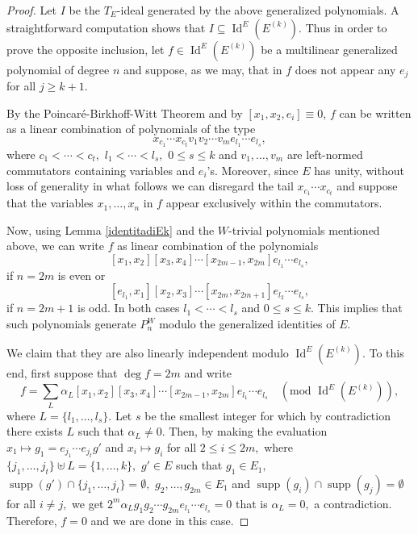 \documentclass[10pt,a4paper]{amsart}
\DeclareMathOperator{\I}{Id}
\DeclareMathOperator{\supp}{supp}
\begin{document}
\begin{proof}
    Let $I$ be the $T_E$-ideal generated by the above generalized polynomials. A straightforward computation shows that $I\subseteq \I^E(E^{(k)}).$ Thus in order to prove the opposite inclusion, let $f\in\I^E(E^{(k)})$ be a multilinear generalized polynomial of degree $n$ and suppose, as we may, that in $f$ does not appear any $e_j$ for all $j\geq k+1.$ 

    By the Poincaré-Birkhoff-Witt Theorem and by $[x_1,x_2,e_i]\equiv 0$, $f$ can be written as a linear combination of polynomials of the type
    $$
    x_{c_1}\cdots x_{c_t}v_1v_2\cdots v_me_{l_1}\cdots e_{l_s},
    $$
    where $c_1<\cdots < c_t,$ $l_1<\cdots <l_s,$ $0\leq s\leq k$ and $v_1,\ldots, v_m$ are left-normed commutators containing variables and $e_i$'s. Moreover, since $E$ has unity, without loss of generality in what follows we can disregard the tail $x_{c_1}\cdots x_{c_t}$ and suppose that the variables $x_1,\ldots,x_n$ in $f$ appear exclusively within the commutators.
    
    Now, using Lemma \ref{identitadiEk} and the $W$-trivial polynomials mentioned above, we can write $f$ as linear combination of the polynomials
    \begin{equation}\label{polinomigradopari}
    [x_{1},x_{2}][x_3,x_4]\cdots [x_{2m-1},x_{2m}]e_{l_1}\cdots e_{l_s},
    \end{equation}
    if $n=2m$ is even or 
    \begin{equation}\label{polinomigradodispari}
    [e_{l_1},x_{1}][x_2,x_3]\cdots [x_{2m},x_{2m+1}]e_{l_2}\cdots e_{l_s},
    \end{equation}
    if $n=2m+1$ is odd. In both cases $l_1<\cdots <l_s$ and $0\leq s\leq k.$ This implies that such polynomials generate $P^W_n$ modulo the generalized identities of $E.$

    We claim that they are also linearly independent modulo $\I^E(E^{(k)}).$ To this end, first suppose that $\deg f= 2m$ and write
    $$
    f=  \sum_{L}\alpha_L[x_{1},x_{2}][x_3,x_4]\cdots [x_{2m-1},x_{2m}]e_{l_1}\cdots e_{l_s} \quad(\text{mod }\I^E(E^{(k)})),
    $$
    where $L=\{l_1,\ldots, l_s\}.$ Let $s$ be the smallest integer for which by contradiction there exists $L$ such that $\alpha_L\neq 0.$ Then, by making the evaluation $x_1\mapsto g_1= e_{j_1}\cdots e_{j_t}g'$ and $x_i\mapsto g_i$ for all $2\leq i\leq 2m,$ where $\{j_1,\ldots, j_t\}\uplus L=\{1,\ldots, k\},$ $g'\in E$ such that $g_1\in E_1,$ $\supp(g')\cap \{j_1,\ldots, j_t\}=\emptyset,$ $g_2,\ldots, g_{2m}\in E_1$ and $\supp(g_i)\cap\supp(g_j)=\emptyset$ for all $i\neq j,$ we get $2^m \alpha_L g_1g_2\cdots g_{2m}e_{l_1}\cdots e_{l_s}=0 $ that is $\alpha_L=0,$ a contradiction. Therefore, $f=0$ and we are done in this case.


\end{proof}
\end{document}
